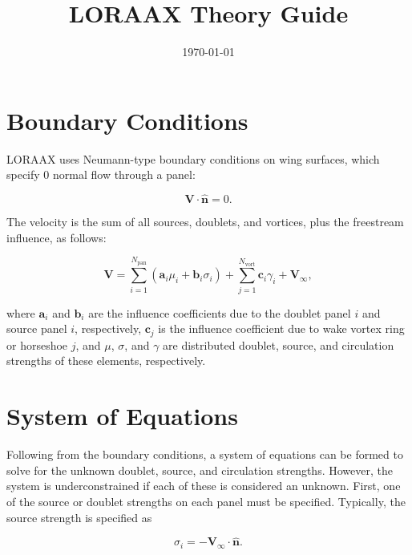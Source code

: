 \documentclass[11pt]{article}
\begin{document}
\title{LORAAX Theory Guide}
\date{\today}
\maketitle

\tableofcontents

\section{Boundary Conditions}\label{sec:bcs}

LORAAX uses Neumann-type boundary conditions on wing surfaces, which specify 0
normal flow through a panel:

\begin{equation}
\mathbf{V}\cdot{\mathbf{\hat{n}}} = 0.
\label{eq:bc1}
\end{equation}

The velocity is the sum of all sources, doublets, and vortices, plus the freestream
influence, as follows:

\begin{equation}
\mathbf{V} = \sum_{i=1}^{N_{\text{pan}}}\left(\mathbf{a}_i\mu_i + \mathbf{b}_i\sigma_i\right)
           + \sum_{j=1}^{N_{\text{vort}}}\mathbf{c}_i\gamma_i + \mathbf{V}_\infty,
\label{eq:vel1}
\end{equation}

\noindent where $\mathbf{a}_i$ and $\mathbf{b}_i$ are the influence
coefficients due to the
doublet panel $i$ and source panel $i$, respectively, $\mathbf{c}_j$ is the
influence
coefficient due to wake vortex ring or horseshoe $j$, and $\mu$, $\sigma$, and
$\gamma$ are distributed doublet, source, and circulation strengths of these
elements, respectively.

\section{System of Equations}

Following from the boundary conditions, a system of equations can be formed to
solve for the unknown doublet, source, and circulation strengths. However, the
system is underconstrained if each of these is considered an unknown. First, one
of the source or doublet strengths on each panel must be specified. Typically,
the source strength is specified as

\begin{equation}
\sigma_i = -\mathbf{V}_\infty\cdot\mathbf{\hat{n}}.
\label{eq:sigma1}
\end{equation}
\end{document}
